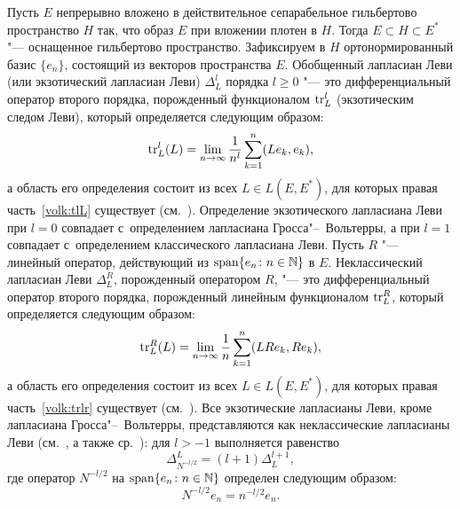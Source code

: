  Пусть $E$ непрерывно вложено в действительное
 сепарабельное гильбертово пространство $H$ так, что
 образ $E$ при вложении плотен в $H$.
Тогда $E\subset H\subset E^\ast$ "--- оснащенное
гильбертово пространство. 
Зафиксируем  в $H$  ортонормированный базис $\{e_n\}$, состоящий из векторов пространства $E$. 
Обобщенный лапласиан Леви (или экзотический лапласиан Леви) $\Delta_L^l$
 порядка $l\geq0$ "--- это дифференциальный оператор второго порядка,  порожденный функционалом $\mathop{\rm tr}\nolimits_ L^l$ (экзотическим следом Леви), который определяется  следующим образом:
  \begin{equation}
 \label{volk:tlL}
 \mathop{\rm tr}\nolimits_ L^l(L)=\lim_{n\to\infty}\frac 1{n^l}\sum_{k=1}^n(Le_k, e_k),
 \end{equation} 
 а область его определения  состоит из всех $L\in L(E,E^\ast)$, для которых правая часть~\eqref{volk:tlL} существует (см.~\cite{volkov:bib:AS2, volkov:bib:AS1993}).
 Определение экзотического лапласиана Леви при $l=0$ совпадает с~определением лапласиана Гросса"--~Вольтерры, а при $l=1$ совпадает с~определением классического лапласиана Леви.
 Пусть $R$ "--- линейный  оператор, действующий из $\mathop{\rm span} \{e_n\colon n\in \mathbb{N}\}$ в $E$.
Неклассический  лапласиан Леви  $\Delta_L^R$, порожденный оператором $R$,  "--- это дифференциальный оператор второго порядка,  порожденный линейным  функционалом $\mathop{\rm tr}\nolimits_ L^R$, который определяется  следующим образом:
 \begin{equation}
 \label{volk:trlr}
 \mathop{\rm tr}\nolimits_ L^R(L)=\lim_{n\to\infty}\frac 1{n}\sum_{k=1}^n(LRe_k, Re_k),
 \end{equation}
а область его определения состоит из всех $L\in L(E,E^\ast)$, для которых правая часть~\eqref{volk:trlr} существует (см.~\cite{volkov:bib:AS}).
  Все экзотические лапласианы Леви, кроме лапласиана Гросса"--~Вольтерры, представляются как неклассические лапласианы Леви (см.~\cite{volkov:bib:v3}, а также ср.~\cite{volkov:bib:AS2,volkov:bib:AJS2013}):
 для $l>-1$ выполняется равенство
  $$
  \Delta_{N^{- l/2}}^L=(l+1)\Delta_L^{l+1},
  $$
где оператор $N^{-l/2}$ на  $\mathop{\rm span} \{e_n\colon n\in \mathbb{N}\}$ определен следующим образом:  $$N^{-l/2}e_n=n^{- l/2}e_n.$$


